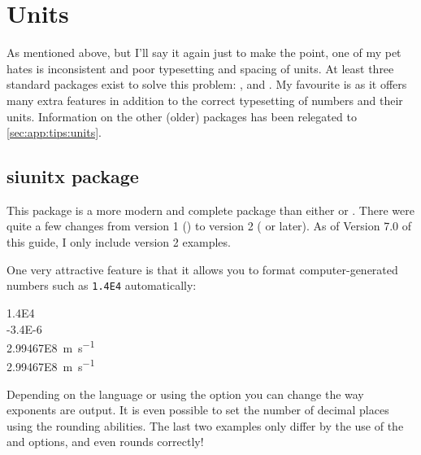\section{Units}%
\label{sec:tips:units}

As mentioned above, but I'll say it again just to make the point,
one of my pet hates is inconsistent and poor typesetting and spacing
of units. At least three standard packages exist to solve this
problem: ,  and . My
favourite is  as it offers many extra features in
addition to the correct typesetting of numbers and their units.
Information on the other (older) packages has been relegated to
\cref{sec:app:tips:units}.


\subsection{siunitx package}%
\label{sec:tips:siunitx}

This package is a more modern and complete package than either
 or .
There were quite a few changes from version 1
() to version 2 ( or later).
As of Version 7.0 of this guide, I only include version 2 examples.

One very attractive feature is that it allows you to format
computer-generated numbers
such as \verb+1.4E4+ automatically:
\begin{tcblisting}{}
\num{1.4E4}\\
\num[exponent-product=\cdot]{-3.4E-6}\\
\SI{2.99467E8}{\metre\per\second}\\
\SI[round-mode=places,round-precision=1]{2.99467E8}{\m.\s^{-1}}
\end{tcblisting}
\noindent
Depending on the language or using the option 
you can change the way exponents are output.
It is even possible to set the number of decimal places
using the rounding abilities.
The last two examples only differ by the use of the  and
 options, and even rounds correctly!

